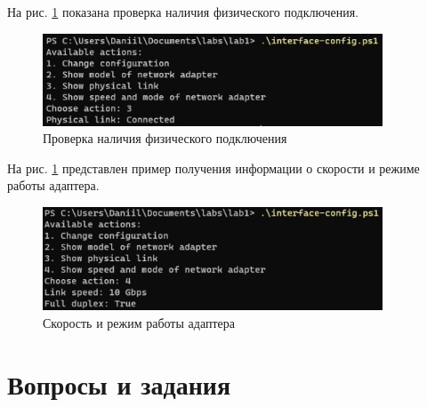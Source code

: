 \documentclass[a4paper, 14pt]{extarticle}
\begin{document}
На рис. \ref{fig:ps1-link} показана проверка наличия физического подключения.

\begin{figure}[H]
  \centering
  \includegraphics[width=0.9\textwidth]{images/ps1/link.png}
  \caption{Проверка наличия физического подключения}
  \label{fig:ps1-link}
\end{figure}

На рис. \ref{fig:ps1-link} представлен пример получения информации о скорости и
режиме работы адаптера.

\begin{figure}[H]
  \centering
  \includegraphics[width=0.9\textwidth]{images/ps1/speed.png}
  \caption{Скорость и режим работы адаптера}
  \label{fig:ps1-speed}
\end{figure}

\newpage

\section{Вопросы и задания}
\end{document}
